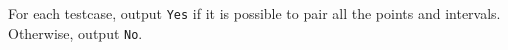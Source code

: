 For each testcase, output \texttt{Yes} if it is possible to pair all the points and intervals. 
Otherwise, output \texttt{No}.